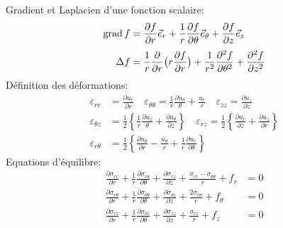 \noindent Gradient et Laplacien d'une fonction scalaire:
\begin{align*}
    \operatorname*{\mathrm{grad}} f &= \frac{\partial f}{\partial r} \vec{e}_r + \frac{1}{r} \frac{\partial f}{\partial \theta} \vec{e}_{\theta} + \frac{\partial f}{\partial z} \vec{e}_z \\[3pt]
    \Delta f &= \frac{1}{r} \frac{\partial}{\partial r} \bigl( r \frac{\partial f}{\partial r} \bigr) + \frac{1}{r^{2}}\frac{\partial^2 f}{\partial \theta^2} + \frac{\partial^2 f}{\partial z^2}
\end{align*}
Définition des déformations:
\begin{align*}
    \varepsilon_{rr} &= \frac{\partial u_r}{\partial r} \quad \varepsilon_{\theta\theta} = \frac{1}{r} \frac{\partial u_{\theta}}{\theta} + \frac{u_r}{r} \quad \varepsilon_{zz} = \frac{\partial u_z}{\partial z} \\[3pt]
    \varepsilon_{\theta z} &= \frac{1}{2} \left\{ \frac{1}{r} \frac{\partial u_z}{\theta} + \frac{\partial u_{\theta}}{\partial z} \right\} \quad \varepsilon_{rz} = \frac{1}{2} \left\{ \frac{\partial u_r}{\partial z} + \frac{\partial u_z}{\partial r} \right\} \\[3pt]
    \varepsilon_{r\theta} &= \frac{1}{2} \left\{ \frac{\partial u_{\theta}}{\partial r} - \frac{u_{\theta}}{r} + \frac{1}{r} \frac{\partial u_r}{\partial \theta} \right\}
\end{align*}
Equations d'équilibre:
\begin{align*}
    \frac{\partial \sigma_{rr}}{\partial r} + \frac{1}{r} \frac{\partial \sigma_{r\theta}}{\partial \theta} + \frac{\partial \sigma_{rz}}{\partial z} + \frac{\sigma_{rr} - \sigma_{\theta\theta}}{r} + f_r &=0\\[3pt]
    \frac{\partial \sigma_{r\theta}}{\partial r} + \frac{1}{r} \frac{\partial \sigma_{\theta\theta}}{\partial \theta} + \frac{\partial \sigma_{\theta z}}{\partial z} + \frac{2\sigma_{r\theta}}{r} + f_{\theta} &=0\\[3pt]
    \frac{\partial \sigma_{rz}}{\partial r} + \frac{1}{r} \frac{\partial \sigma_{\theta z}}{\partial \theta} + \frac{\partial \sigma_{zz}}{\partial z} + \frac{\sigma_{rz}}{r} + f_z &=0
\end{align*}
